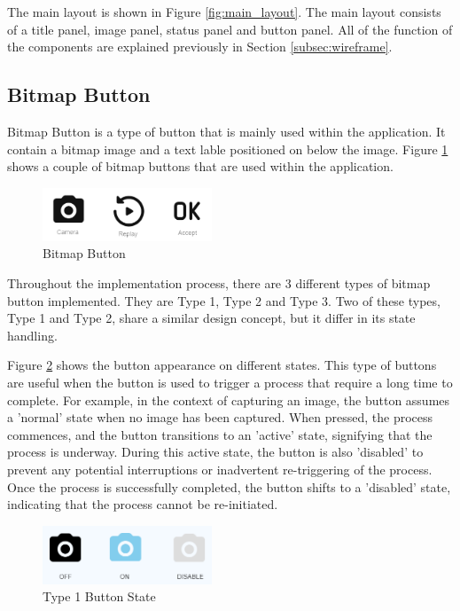 The main layout is shown in Figure \ref{fig:main_layout}. The main layout consists of a title panel, image panel, status panel and button panel. All of the function of the components are explained previously in Section \ref{subsec:wireframe}.



\subsection{Bitmap Button}
Bitmap Button is a type of button that is mainly used within the application. It contain a bitmap image and a text lable positioned on below the image. Figure \ref{fig:bitmap_button} shows a couple of bitmap buttons that are used within the application.

\begin{figure}[!ht]
    \centering
    \includegraphics[width=0.45\textwidth]{texs/Part2/chapter4/image/bitmapbutton.png}
    \caption{Bitmap Button}
    \label{fig:bitmap_button}
\end{figure}

Throughout the implementation process, there are 3 different types of
bitmap button implemented. They are Type 1, Type 2 and Type 3. Two of these types, Type 1 and Type 2, share a similar design concept, but it differ in its state handling.

Figure \ref{fig:type1_state} shows  the button appearance on different states. This type of buttons are useful when the button is used to trigger a process that require a long time to complete.  For example, in the context of capturing an image, the button assumes a 'normal' state when no image has been captured. When pressed, the process commences, and the button transitions to an 'active' state, signifying that the process is underway. During this active state, the button is also 'disabled' to prevent any potential interruptions or inadvertent re-triggering of the process. Once the process is successfully completed, the button shifts to a 'disabled' state, indicating that the process cannot be re-initiated.

\begin{figure}[!ht]
    \centering
    \includegraphics[width=0.45\textwidth]{texs/Part2/chapter4/image/type1state.png}
    \caption{Type 1 Button State}
    \label{fig:type1_state}
\end{figure}

